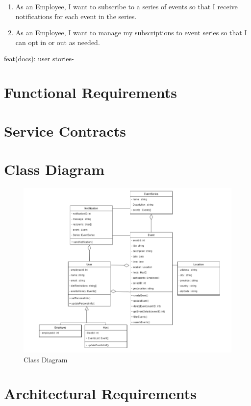 \documentclass[a4paper,12pt]{article}
\begin{document}
\begin{enumerate}
    \item As an Employee, I want to subscribe to a series of events so that I receive notifications for each event in the series.
    \item As an Employee, I want to manage my subscriptions to event series so that I can opt in or out as needed.
\end{enumerate}

feat(docs): user stories-
\section{Functional Requirements}
\label{sec:functional-requirements}

\section{Service Contracts}
\label{sec:service-contracts}

\section{Class Diagram}
\label{sec:class-diagram}
\label{sec:class-diagram}
\begin{figure}[H]
    \centering
    \includegraphics[width=\textwidth]{EventsClassDiagram.png}
    \caption{Class Diagram}
    \label{fig:class-diagram}
\end{figure}

\section{Architectural Requirements}
\label{sec:architectural-requirements}
\end{document}
